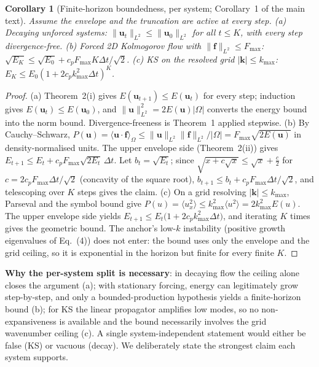 \documentclass[11pt,a4paper]{article}
\newtheorem{corollary}{Corollary}
\newcommand{\bu}{\bm{u}}
\newcommand{\Ex}{E}
\begin{document}
\begin{corollary}[Finite-horizon boundedness, per system; Corollary~1 of the main text]
Assume the envelope and the truncation are active at every step.
(a) Decaying unforced systems: $\|\bu_t\|_{L^2}\le\|\bu_0\|_{L^2}$ for all $t\le K$, with every step divergence-free.
(b) Forced 2D Kolmogorov flow with $\|\bm f\|_{L^2}\le F_{\max}$: $\sqrt{\Ex_K}\le\sqrt{\Ex_0}+c_pF_{\max}K\Delta t/\sqrt2$.
(c) KS on the resolved grid $|\bm k|\le k_{\max}$: $\Ex_K\le\Ex_0(1+2c_pk_{\max}^2\Delta t)^K$.
\end{corollary}

\begin{proof}
(a) Theorem~2(i) gives $\Ex(\bu_{t+1})\le\Ex(\bu_t)$ for every step; induction gives $\Ex(\bu_t)\le\Ex(\bu_0)$, and $\|\bu\|_{L^2}^2=2\Ex(\bu)|\Omega|$ converts the energy bound into the norm bound. Divergence-freeness is Theorem~1 applied stepwise.
(b) By Cauchy--Schwarz, $P(\bu)=\langle\bu\cdot\bm f\rangle_\Omega\le\|\bu\|_{L^2}\|\bm f\|_{L^2}/|\Omega| = F_{\max}\sqrt{2\Ex(\bu)}$ in density-normalised units. The upper envelope side (Theorem~2(ii)) gives $\Ex_{t+1}\le\Ex_t+c_pF_{\max}\sqrt{2\Ex_t}\,\Delta t$. Let $b_t=\sqrt{\Ex_t}$; since $\sqrt{x+c\sqrt{x}}\le\sqrt{x}+\tfrac{c}{2}$ for $c=2c_pF_{\max}\Delta t/\sqrt{2}$ (concavity of the square root), $b_{t+1}\le b_t+c_pF_{\max}\Delta t/\sqrt2$, and telescoping over $K$ steps gives the claim.
(c) On a grid resolving $|\bm k|\le k_{\max}$, Parseval and the symbol bound give $P(u)=\langle u_x^2\rangle\le k_{\max}^2\langle u^2\rangle=2k_{\max}^2\Ex(u)$. The upper envelope side yields $\Ex_{t+1}\le\Ex_t\big(1+2c_pk_{\max}^2\Delta t\big)$, and iterating $K$ times gives the geometric bound. The anchor's low-$k$ instability (positive growth eigenvalues of Eq.~(4)) does not enter: the bound uses only the envelope and the grid ceiling, so it is exponential in the horizon but finite for every finite $K$.
\end{proof}

\textbf{Why the per-system split is necessary}: in decaying flow the ceiling alone closes the argument (a); with stationary forcing, energy can legitimately grow step-by-step, and only a bounded-production hypothesis yields a finite-horizon bound (b); for KS the linear propagator amplifies low modes, so no non-expansiveness is available and the bound necessarily involves the grid wavenumber ceiling (c). A single system-independent statement would either be false (KS) or vacuous (decay). We deliberately state the strongest claim each system supports.
\end{document}
